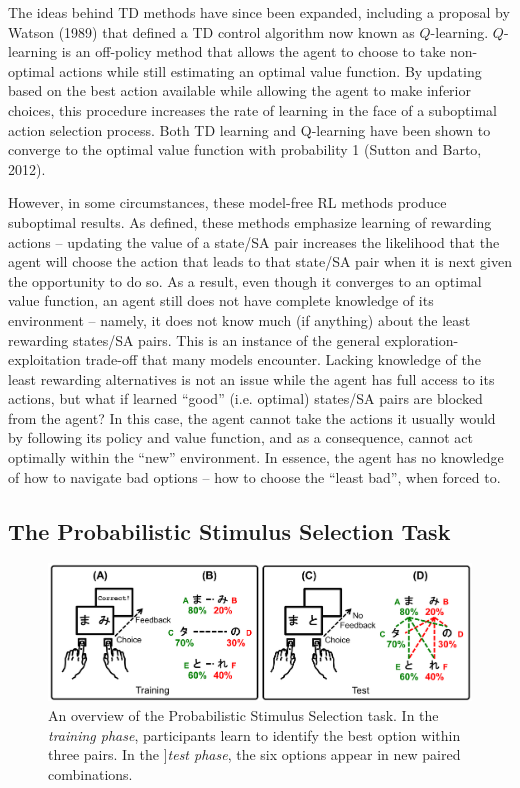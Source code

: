 \documentclass[10pt,letterpaper]{article}
\begin{document}
The ideas behind TD methods have since been expanded, including a proposal by Watson (1989) that defined a TD control algorithm now known as $Q$-learning. $Q$-learning is an off-policy method that allows the agent to choose to take non-optimal actions while still estimating an optimal value function. By updating based on the best action available while allowing the agent to make inferior choices, this procedure increases the rate of learning in the face of a suboptimal action selection process. Both TD learning and Q-learning have been shown to converge to the optimal value function with probability 1 (Sutton and Barto, 2012).

However, in some circumstances, these model-free RL methods produce suboptimal results. As defined, these methods emphasize learning of rewarding actions – updating the value of a state/SA pair increases the likelihood that the agent will choose the action that leads to that state/SA pair when it is next given the opportunity to do so. As a result, even though it converges to an optimal value function, an agent still does not have complete knowledge of its environment – namely, it does not know much (if anything) about the least rewarding states/SA pairs. This is an instance of the general exploration-exploitation trade-off that many models encounter. Lacking knowledge of the least rewarding alternatives is not an issue while the agent has full access to its actions, but what if learned ``good'' (i.e. optimal) states/SA pairs are blocked from the agent? In this case, the agent cannot take the actions it usually would by following its policy and value function, and as a consequence, cannot act optimally within the ``new'' environment. In essence, the agent has no knowledge of how to navigate bad options – how to choose the “least bad”, when forced to.

\subsection{The Probabilistic Stimulus Selection Task}

\begin{figure}[ht]
	\begin{center}
		\includegraphics[width=\textwidth]{pss.png}
	\end{center}
	\caption{An overview of the Probabilistic Stimulus Selection task. In the \emph{training phase}, participants learn to identify the best option within three pairs. In the ]\emph{test phase}, the six options appear in new paired combinations.}
	\label{pss}
\end{figure}
\end{document}
